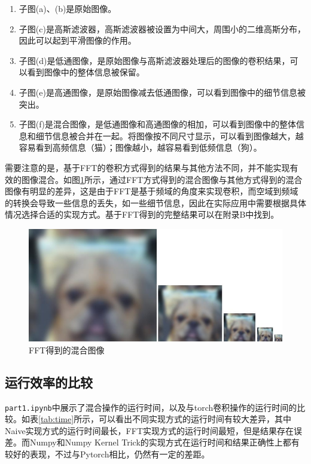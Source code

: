 \documentclass{article}
\begin{document}
\begin{enumerate}
    \item 子图(a)、(b)是原始图像。
    \item 子图(c)是高斯滤波器，高斯滤波器被设置为中间大，周围小的二维高斯分布，因此可以起到平滑图像的作用。
    \item 子图(d)是低通图像，是原始图像与高斯滤波器处理后的图像的卷积结果，可以看到图像中的整体信息被保留。
    \item 子图(e)是高通图像，是原始图像减去低通图像，可以看到图像中的细节信息被突出。
    \item 子图(f)是混合图像，是低通图像和高通图像的相加，可以看到图像中的整体信息和细节信息被合并在一起。将图像按不同尺寸显示，可以看到图像越大，越容易看到高频信息（猫）；图像越小，越容易看到低频信息（狗）。
\end{enumerate}

需要注意的是，基于FFT的卷积方式得到的结果与其他方法不同，并不能实现有效的图像混合。如图\ref{fig:fft}所示，通过FFT方式得到的混合图像与其他方式得到的混合图像有明显的差异，这是由于FFT是基于频域的角度来实现卷积，而空域到频域的转换会导致一些信息的丢失，如一些细节信息，因此在实际应用中需要根据具体情况选择合适的实现方式。基于FFT得到的完整结果可以在附录B中找到。

\begin{figure}[htbp]
    \centering
    \includegraphics[width=\textwidth]{images/part1_fft/hybrid_image_scales.jpg}
    \caption{FFT得到的混合图像}
    \label{fig:fft}
\end{figure}

\subsection{运行效率的比较}

\texttt{part1.ipynb}中展示了混合操作的运行时间，以及与torch卷积操作的运行时间的比较。如表\ref{tab:time}所示，可以看出不同实现方式的运行时间有较大差异，其中Naive实现方式的运行时间最长，FFT实现方式的运行时间最短，但是结果存在误差。而Numpy和Numpy Kernel Trick的实现方式在运行时间和结果正确性上都有较好的表现，不过与Pytorch相比，仍然有一定的差距。
\end{document}
